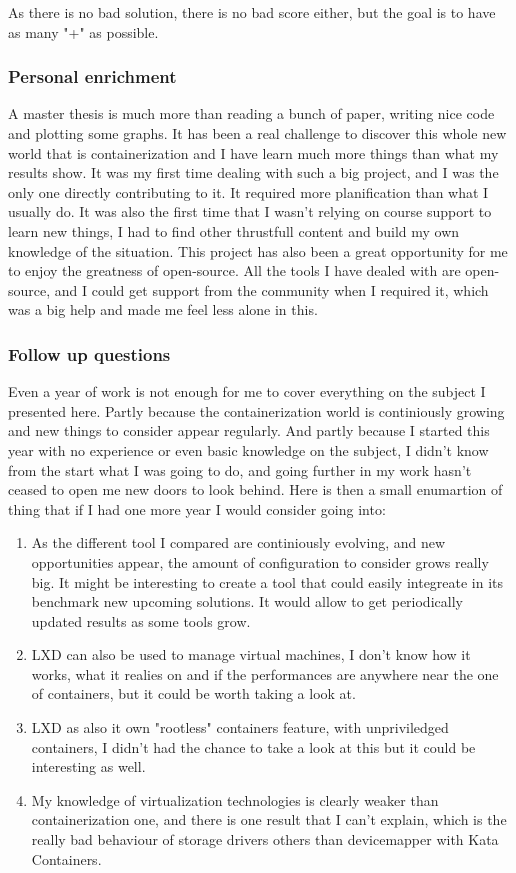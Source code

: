 As there is no bad solution, there is no bad score either, but the goal is to have as many "+" as possible.

\subsubsection{Personal enrichment}
A master thesis is much more than reading a bunch of paper, writing nice code and plotting some graphs.  It has been a real challenge to discover this whole new world that is containerization and I have learn much more things than what my results show.  It was my first time dealing with such a big project, and I was the only one directly contributing to it.  It required more planification than what I usually do.  It was also the first time that I wasn't relying on course support to learn new things, I had to find other thrustfull content and build my own knowledge of the situation.  This project has also been a great opportunity for me to enjoy the greatness of open-source. All the tools I have dealed with are open-source, and I could get support from the community when I required it, which was a big help and made me feel less alone in this.

\subsubsection{Follow up questions}

Even a year of work is not enough for me to cover everything on the subject I presented here.  Partly because the containerization world is continiously growing and new things to consider appear regularly.  And partly because I started this year with no experience or even basic knowledge on the subject, I didn't know from the start what I was going to do, and going further in my work hasn't ceased to open me new doors to look behind.  Here is then a small enumartion of thing that if I had one more year I would consider going into:
\begin{enumerate}
  \item As the different tool I compared are continiously evolving, and new opportunities appear, the amount of configuration to consider grows really big.  It might be interesting to create a tool that could easily integreate in its benchmark new upcoming solutions.  It would allow to get periodically updated results as some tools grow.
  \item LXD can also be used to manage virtual machines, I don't know how it works, what it realies on and if the performances are anywhere near the one of containers, but it could be worth taking a look at.
  \item LXD as also it own "rootless" containers feature, with unpriviledged containers, I didn't had the chance to take a look at this but it could be interesting as well.
  \item My knowledge of virtualization technologies is clearly weaker than containerization one, and there is one result that I can't explain, which is the really bad behaviour of storage drivers others than devicemapper with Kata Containers.
\end{enumerate}
